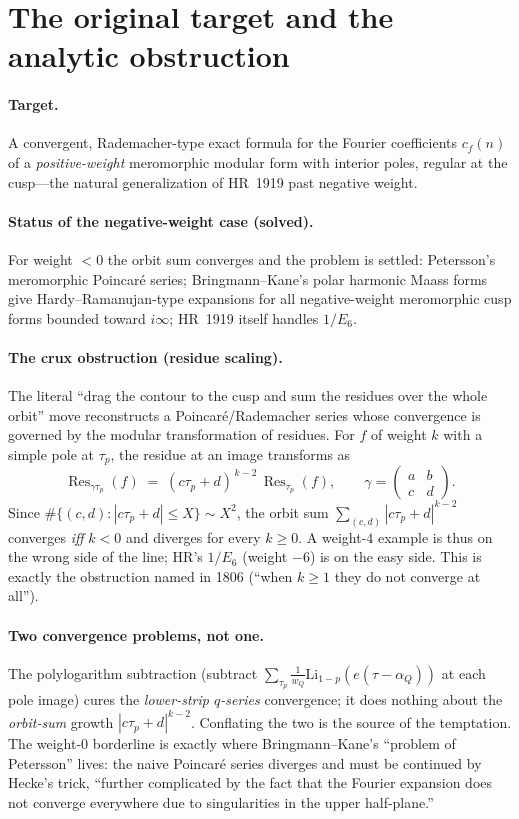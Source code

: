 \documentclass[11pt]{article}
\newcommand{\Res}{\operatorname{Res}}
\newcommand{\taup}{\tau_p}
\begin{document}
\section{The original target and the analytic obstruction}

\paragraph{Target.}
A convergent, Rademacher-type exact formula for the Fourier coefficients $c_f(n)$ of a
\emph{positive-weight} meromorphic modular form with interior poles, regular at the
cusp---the natural generalization of HR~1919 past negative weight.

\paragraph{Status of the negative-weight case (solved).}
For weight $<0$ the orbit sum converges and the problem is settled: Petersson's
meromorphic Poincar\'e series; Bringmann--Kane's polar harmonic Maass forms give
Hardy--Ramanujan-type expansions for all negative-weight meromorphic cusp forms bounded
toward $i\infty$; HR~1919 itself handles $1/E_6$.

\paragraph{The crux obstruction (residue scaling).}
The literal ``drag the contour to the cusp and sum the residues over the whole orbit''
move reconstructs a Poincar\'e/Rademacher series whose convergence is governed by the
modular transformation of residues. For $f$ of weight $k$ with a simple pole at $\taup$,
the residue at an image transforms as
\[
  \Res_{\gamma\taup}(f) \;=\; (c\taup+d)^{\,k-2}\,\Res_{\taup}(f),
  \qquad \gamma=\begin{pmatrix} a & b\\ c & d\end{pmatrix}.
\]
Since $\#\{(c,d): |c\taup+d|\le X\}\sim X^2$, the orbit sum $\sum_{(c,d)}|c\taup+d|^{k-2}$
converges \emph{iff} $k<0$ and diverges for every $k\ge 0$. A weight-$4$ example is thus
on the wrong side of the line; HR's $1/E_6$ (weight $-6$) is on the easy side. This is
exactly the obstruction named in 1806 (``when $k\ge1$ they do not converge at all'').

\paragraph{Two convergence problems, not one.}
The polylogarithm subtraction (subtract $\sum_{\taup}\tfrac1{w_Q}\mathrm{Li}_{1-p}(e(\tau-\alpha_Q))$
at each pole image) cures the \emph{lower-strip $q$-series} convergence; it does nothing
about the \emph{orbit-sum} growth $|c\taup+d|^{k-2}$. Conflating the two is the source of
the temptation. The weight-$0$ borderline is exactly where Bringmann--Kane's
``problem of Petersson'' lives: the naive Poincar\'e series diverges and must be
continued by Hecke's trick, ``further complicated by the fact that the Fourier expansion
does not converge everywhere due to singularities in the upper half-plane.''
\end{document}
